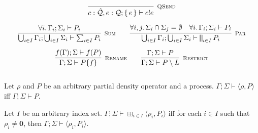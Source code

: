 \begin{gather*}
\infer[\mbox{\footnotesize\scshape QSend}]{c : \hat{\mathcal{Q}}, e:\mathcal{Q} ; \set{e} \vdash c!e}{} \\[0.2cm]
\infer[\mbox{\footnotesize\scshape Sum}]{\bigcup_{i \in I}\Gamma_i; \bigcup_{i \in I}\Sigma_i \vdash \sum_{i \in I} P_i}{\forall i \ldotp \Gamma_i; \Sigma_i \vdash P_i} \qquad 
\infer[\mbox{\footnotesize\scshape Par}]{\bigcup_{i \in I}\Gamma_i; \bigcup_{i \in I}\Sigma_i \vdash \bigparallel_{i \in I} P_i}
{\forall i, j \ldotp \Sigma_i \cap \Sigma_j = \emptyset & \forall i \ldotp \Gamma_i; \Sigma_i \vdash P_i} \\[0.2cm]
\infer[\mbox{\footnotesize\scshape Rename}]{\Gamma; \Sigma \vdash P \{f\}}{f(\Gamma); \Sigma \vdash f(P)} \qquad
\infer[\mbox{\footnotesize\scshape Restrict}]{\Gamma; \Sigma \vdash P \setminus L}{\Gamma; \Sigma \vdash P} \\[0.3cm]
\end{gather*}

\begin{definition}
  Let $\rho$ and $P$ be an arbitrary partial density operator and a process. $\Gamma; \Sigma \vdash \langle \rho, P \rangle$ iff $\Gamma; \Sigma \vdash P$.

  Let $I$ be an arbitrary index set. $\Gamma; \Sigma \vdash \boxplus_{i \in I} \langle \rho_i, P_i \rangle$ iff for each $i \in I$ such that $\rho_i \neq \mathbf{0}$,
  then $\Gamma; \Sigma \vdash \langle \rho_i, P_i \rangle$.
\end{definition}


